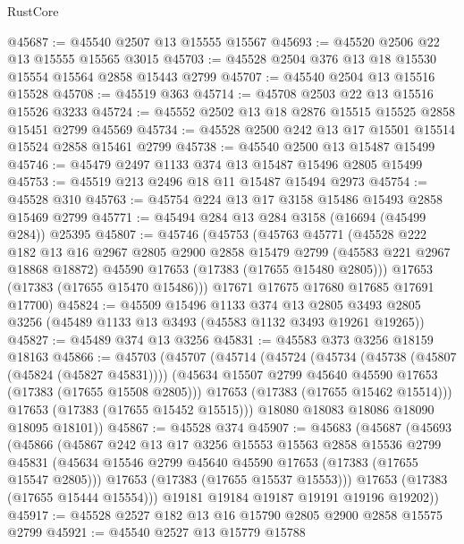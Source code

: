 \begin{lexlean}{RustCore}
\begin{coremodule}
@45687 := @45540 @2507 @13 @15555 @15567
@45693 := @45520 @2506 @22 @13 @15555 @15565 @3015
@45703 := @45528 @2504 @376 @13 @18 @15530 @15554 @15564 @2858 @15443 @2799
@45707 := @45540 @2504 @13 @15516 @15528
@45708 := @45519 @363
@45714 := @45708 @2503 @22 @13 @15516 @15526 @3233
@45724 := @45552 @2502 @13 @18 @2876 @15515 @15525 @2858 @15451 @2799 @45569
@45734 := @45528 @2500 @242 @13 @17 @15501 @15514 @15524 @2858 @15461 @2799
@45738 := @45540 @2500 @13 @15487 @15499
@45746 := @45479 @2497 @1133 @374 @13 @15487 @15496 @2805 @15499
@45753 := @45519 @213 @2496 @18 @11 @15487 @15494 @2973
@45754 := @45528 @310
@45763 := @45754 @224 @13 @17 @3158 @15486 @15493 @2858 @15469 @2799
@45771 := @45494 @284 @13 @284 @3158 (@16694 (@45499 @284)) @25395
@45807 := @45746
    (@45753
      (@45763
        @45771
        (@45528
          @222
          @182
          @13
          @16
          @2967
          @2805
          @2900
          @2858
          @15479
          @2799
          (@45583 @221 @2967 @18868 @18872)
          @45590
          @17653
          (@17383 (@17655 @15480 @2805)))
        @17653
        (@17383 (@17655 @15470 @15486)))
      @17671
      @17675
      @17680
      @17685
      @17691
      @17700)
@45824 := @45509
    @15496
    @1133
    @374
    @13
    @2805
    @3493
    @2805
    @3256
    (@45489 @1133 @13 @3493 (@45583 @1132 @3493 @19261 @19265))
@45827 := @45489 @374 @13 @3256
@45831 := @45583 @373 @3256 @18159 @18163
@45866 := @45703
    (@45707
      (@45714
        (@45724
          (@45734
            (@45738 (@45807 (@45824 (@45827 @45831))))
            (@45634 @15507 @2799 @45640 @45590 @17653 (@17383 (@17655 @15508 @2805)))
            @17653
            (@17383 (@17655 @15462 @15514)))
          @17653
          (@17383 (@17655 @15452 @15515)))
        @18080
        @18083
        @18086
        @18090
        @18095
        @18101))
@45867 := @45528 @374
@45907 := @45683
    (@45687
      (@45693
        (@45866
          (@45867
            @242
            @13
            @17
            @3256
            @15553
            @15563
            @2858
            @15536
            @2799
            @45831
            (@45634 @15546 @2799 @45640 @45590 @17653 (@17383 (@17655 @15547 @2805)))
            @17653
            (@17383 (@17655 @15537 @15553)))
          @17653
          (@17383 (@17655 @15444 @15554)))
        @19181
        @19184
        @19187
        @19191
        @19196
        @19202))
@45917 := @45528 @2527 @182 @13 @16 @15790 @2805 @2900 @2858 @15575 @2799
@45921 := @45540 @2527 @13 @15779 @15788

\end{coremodule}
\end{lexlean}

